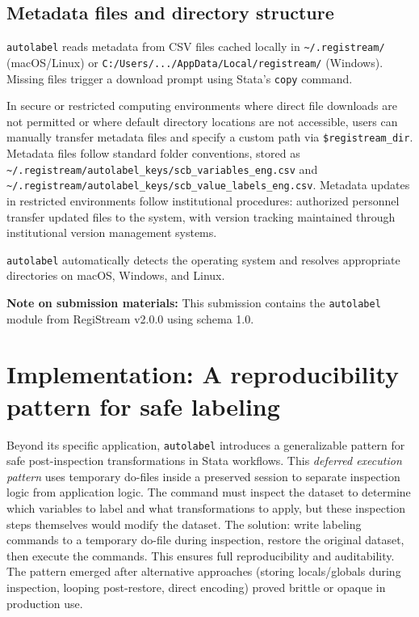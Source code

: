 \subsection{Metadata files and directory structure}

\texttt{autolabel} reads metadata from CSV files cached locally in \texttt{\textasciitilde/.registream/} (macOS/Linux) or \texttt{C:/Users/.../AppData/Local/registream/} (Windows). Missing files trigger a download prompt using Stata's \texttt{copy} command.

In secure or restricted computing environments where direct file downloads are not permitted or where default directory locations are not accessible, users can manually transfer metadata files and specify a custom path via \texttt{\$registream\_dir}. Metadata files follow standard folder conventions, stored as \texttt{\textasciitilde/.registream/autolabel\_keys/scb\_variables\_eng.csv} and \texttt{\textasciitilde/.registream/autolabel\_keys/scb\_value\_labels\_eng.csv}. Metadata updates in restricted environments follow institutional procedures: authorized personnel transfer updated files to the system, with version tracking maintained through institutional version management systems.

\texttt{autolabel} automatically detects the operating system and resolves appropriate directories on macOS, Windows, and Linux.

\textbf{Note on submission materials:} This submission contains the \texttt{autolabel} module from RegiStream v2.0.0 using schema 1.0.





\section{Implementation: A reproducibility pattern for safe labeling}

Beyond its specific application, \texttt{autolabel} introduces a generalizable pattern for safe post-inspection transformations in Stata workflows. This \emph{deferred execution pattern} uses temporary do-files inside a preserved session to separate inspection logic from application logic. The command must inspect the dataset to determine which variables to label and what transformations to apply, but these inspection steps themselves would modify the dataset. The solution: write labeling commands to a temporary do-file during inspection, restore the original dataset, then execute the commands. This ensures full reproducibility and auditability. The pattern emerged after alternative approaches (storing locals/globals during inspection, looping post-restore, direct encoding) proved brittle or opaque in production use.

